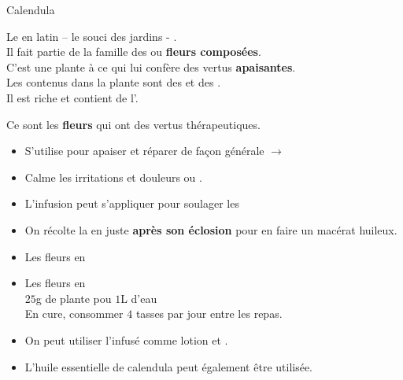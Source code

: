

    
\ficheidentiteplante
{Calendula}
{%
    Le  en latin  – le souci des jardins - .\\
    Il fait partie de la famille des  ou \textbf{fleurs composées}.\\

    C'est une plante à  ce qui lui confère des vertus \textbf{apaisantes}.\\

    Les  contenus dans la plante sont des  et des .\\

    Il est riche  et contient de l'.



}
{%
    Ce sont les \textbf{fleurs} qui ont des vertus thérapeutiques.
    \begin{itemize}[label = \bcplume]
        \item S'utilise pour apaiser et réparer de façon générale $\longrightarrow$ 
        \item Calme les irritations et douleurs  ou .
        \item L'infusion peut s'appliquer pour soulager les 
    \end{itemize}
}
{%
    \begin{itemize}[label = \bcplume]
        \item On récolte la  en  juste \textbf{après son éclosion} pour en faire un macérat huileux. 
    \end{itemize}
}
{%
    \begin{itemize}[label = \bccrayon]
        \item Les fleurs en 
        \item Les fleurs en \\
                $25$g de plante pou $1$L d'eau\\
                En cure, consommer $4$ tasses par jour entre les repas.
        \item On peut utiliser l'infusé comme lotion  et  .
        \item L'huile essentielle de calendula peut également être utilisée.
    \end{itemize}
}
